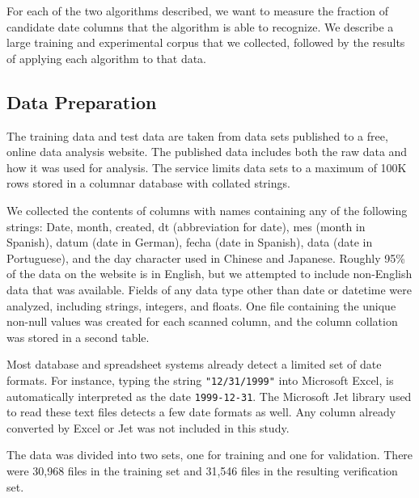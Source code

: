 
For each of the two algorithms described, we want to measure the fraction of candidate date columns that the algorithm is able to recognize. We describe a large training and experimental corpus that we collected, followed by the results of applying each algorithm to that data.
 
\subsection{Data Preparation}

The training data and test data are taken from data sets published to a free, online data analysis website. The published data includes both the raw data and how it was used for analysis. The service limits data sets to a maximum of 100K rows stored in a columnar database with collated strings.

We collected the contents of columns with names containing any of the following strings: Date, month, created, dt (abbreviation for date), mes (month in Spanish), datum (date in German), fecha (date in Spanish), data (date in Portuguese), and the day character used in Chinese and Japanese. Roughly 95\% of the data on the website is in English, but we attempted to include non-English data that was available. Fields of any data type other than date or datetime were analyzed, including strings, integers, and floats. One file containing the unique non-null values was created for each scanned column, and the column collation was stored in a second table.

Most database and spreadsheet systems already detect a limited set of date formats. For instance, typing the string \texttt{"12/31/1999"} into Microsoft Excel, is automatically interpreted as the date \texttt{1999-12-31}. The Microsoft Jet library  used to read these text files detects a few date formats as well. Any column already converted by Excel or Jet was not included in this study.

The data was divided into two sets, one for training and one for validation. There were 30,968 files in the training set and 31,546 files in the resulting verification set.


